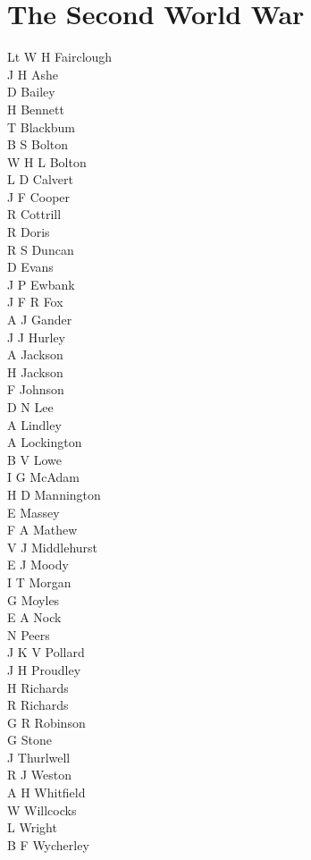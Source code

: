 \section*{The Second World War}

\begin{multicols}{3}
  \small
  \noindent
  Lt W H Fairclough \\
  J H Ashe \\
  D Bailey \\
  H Bennett \\
  T Blackbum \\
  B S Bolton \\
  W H L Bolton \\
  L D Calvert \\
  J F Cooper \\
  R Cottrill \\
  R Doris \\
  R S Duncan \\
  D Evans \\
  J P Ewbank \\
  J F R Fox \\
  A J Gander \\
  J J Hurley \\
  A Jackson \\
  H Jackson \\
  F Johnson \\
  D N Lee \\
  A Lindley \\
  A Lockington \\
  B V Lowe \\
  I G McAdam \\
  H D Mannington \\
  E Massey \\
  F A Mathew \\
  V J Middlehurst \\
  E J Moody \\
  I T Morgan \\
  G Moyles \\
  E A Nock \\
  N Peers \\
  J K V Pollard \\
  J H Proudley \\
  H Richards \\
  R Richards \\
  G R Robinson \\
  G Stone \\
  J Thurlwell \\
  R J Weston \\
  A H Whitfield \\
  W Willcocks \\
  L Wright \\
  B F Wycherley \\
\end{multicols}

